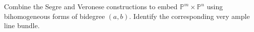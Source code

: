 \begin{problem}\label{chal:vi38-03}
Combine the Segre and Veronese constructions to embed \(\mathbb P^m\times\mathbb P^n\) using bihomogeneous forms of bidegree \((a,b)\).  Identify the corresponding very ample line bundle.
\end{problem}

